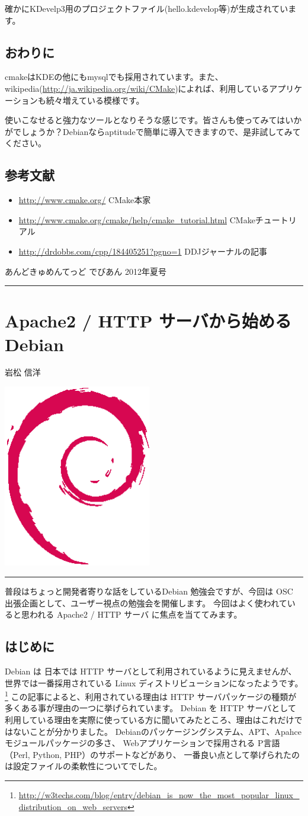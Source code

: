 \documentclass[mingoth,a4paper]{jsarticle}
\renewcommand{\dancersection}[2]{%
\newpage
あんどきゅめんてっど でびあん 2012年夏号
%
\vspace{0.1mm}\\
{\color{dancerdarkblue}\rule{\hsize}{2mm}}

%
%
\begin{minipage}[t]{0.6\hsize}
\color{dancerdarkblue}
\vspace{1cm}
\section{#1}
\hfill{}#2\\
\end{minipage}
\begin{minipage}[t]{0.4\hsize}
\vspace{-2cm}
\hfill{}\includegraphics[height=8cm]{image200502/openlogo-nd.eps}\\
\vspace{-5cm}
\end{minipage}
%
{\color{dancerlightblue}\rule{0.66\hsize}{2mm}}
%
\vspace{2cm}
}
\begin{document}
確かにKDevelp3用のプロジェクトファイル(hello.kdevelop等)が生成されています。

\subsection{おわりに}

cmakeはKDEの他にもmysqlでも採用されています。また、wikipedia(\url{http://ja.wikipedia.org/wiki/CMake})によれば、利用しているアプリケーションも続々増えている模様です。

使いこなせると強力なツールとなりそうな感じです。皆さんも使ってみてはいかがでしょうか？Debianならaptitudeで簡単に導入できますので、是非試してみてください。

\subsection{参考文献}

\begin{itemize}
\item \url{http://www.cmake.org/} CMake本家
\item \url{http://www.cmake.org/cmake/help/cmake_tutorial.html} CMakeチュートリアル
\item \url{http://drdobbs.com/cpp/184405251?pgno=1} DDJジャーナルの記事
\end{itemize}


\dancersection{Apache2 / HTTP サーバから始める Debian}{岩松 信洋}

普段はちょっと開発者寄りな話をしているDebian
勉強会ですが、今回は OSC 出張企画として、ユーザー視点の勉強会を開催します。
今回はよく使われていると思われる Apache2 / HTTP サーバ に焦点を当ててみます。

\subsection{はじめに}

Debian は 日本では HTTP サーバとして利用されているように見えませんが、
世界では一番採用されている Linux ディストリビューションになったようです。
\footnote{\url{http://w3techs.com/blog/entry/debian_is_now_the_most_popular_linux_distribution_on_web_servers}}
この記事によると、利用されている理由は HTTP サーバパッケージの種類が多くある事が理由の一つに挙げられています。
Debian を HTTP サーバとして利用している理由を実際に使っている方に聞いてみたところ、理由はこれだけではないことが分かりました。
Debianのパッケージングシステム、APT、Apahce モジュールパッケージの多さ、
Webアプリケーションで採用される P言語（Perl, Python, PHP）のサポートなどがあり、
一番良い点として挙げられたのは設定ファイルの柔軟性についてでした。
\end{document}
